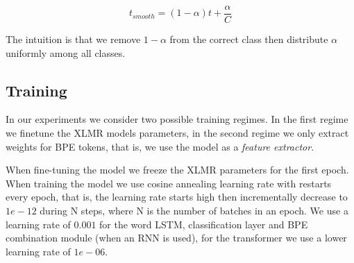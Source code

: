 \documentclass[11pt]{article}
\newcommand\jp[1]{(\textbf{JP:} #1)}
\begin{document}
    \begin{equation}
        t_{smooth} = (1-\alpha)t + \frac{\alpha}{C}
    \end{equation}

            The intuition is that we remove $1-\alpha$ from the
     correct class then distribute $\alpha$ uniformly among all
     classes. 

     \subsection{Training}

	
         In our experiments we consider two possible training
     regimes. In the first regime we finetune the XLMR models
     parameters, in the second regime we only extract weights for BPE
     tokens, that is, we use the model as a \emph{feature extractor}.
     
            	When fine-tuning the model we freeze the XLMR
     parameters for the first epoch.  When training the model we use
     cosine annealing learning rate with restarts every epoch, that
     is, the learning rate starts high then incrementally decrease to
     $1e-12$ during N steps, where N is the number of batches in an
     epoch. We use a learning rate of $0.001$ for the word LSTM,
     classification layer and BPE combination module (when an RNN is
     used), for the transformer we use a lower learning rate of
     $1e-06$.

   
\end{document}
